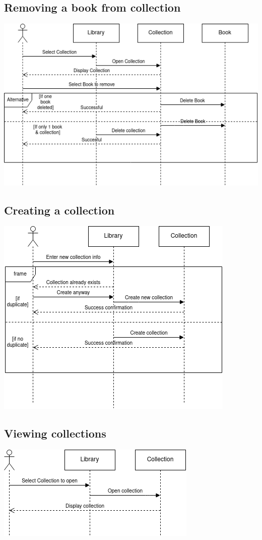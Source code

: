 \documentclass[answers]{exam}
\begin{document}
\subsection{Removing a book from collection}
\begin{center}
\includegraphics[scale=0.75]{images/seq3.png}
\end{center}
\newpage
\subsection{Creating a collection}
\begin{center}
\includegraphics[scale=0.75]{images/seq4.png}
\end{center}
\subsection{Viewing collections}
\begin{center}
    \includegraphics[scale=0.75]{images/seq5.png}
\end{center}
\end{document}

